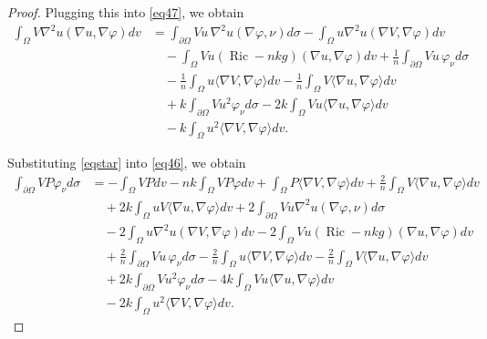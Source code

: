 \documentclass[10pt,a4paper]{amsart}
\begin{document}
\begin{proof}
Plugging this into \eqref{eq47}, we obtain
\begin{align}\label{eqstar}
\int_{\Omega}V\nabla^{2}u(\nabla u,\nabla\varphi)dv
&=
\int_{\partial\Omega}Vu\,\nabla^{2}u(\nabla\varphi,\nu)d\sigma
-
\int_{\Omega}u\nabla^{2}u(\nabla V,\nabla\varphi)dv
\nonumber\\
&\quad
-
\int_{\Omega}Vu(\operatorname{Ric}-nkg)(\nabla u,\nabla\varphi)dv
+
\frac{1}{n}\int_{\partial\Omega}Vu\,\varphi_{\nu}d\sigma
\nonumber\\
&\quad
-
\frac{1}{n}\int_{\Omega}u\langle\nabla V,\nabla\varphi\rangle dv
-
\frac{1}{n}\int_{\Omega}V\langle\nabla u,\nabla\varphi\rangle dv
\nonumber\\
&\quad
+
k\int_{\partial\Omega}Vu^{2}\varphi_{\nu}d\sigma
-
2k\int_{\Omega}Vu\langle\nabla u,\nabla\varphi\rangle dv
\nonumber\\
&\quad
-
k\int_{\Omega}u^{2}\langle\nabla V,\nabla\varphi\rangle dv.
\end{align}

Substituting \eqref{eqstar} into \eqref{eq46}, we obtain
\begin{align}\label{eqtwostar}
\int_{\partial\Omega}VP\varphi_{\nu}d\sigma
&=
-\int_{\Omega}VPdv
-nk\int_{\Omega}VP\varphi dv
+
\int_{\Omega}P\langle\nabla V,\nabla\varphi\rangle dv
+
\frac{2}{n}\int_{\Omega}V\langle\nabla u,\nabla\varphi\rangle dv
\nonumber\\
&\quad
+
2k\int_{\Omega}uV\langle\nabla u,\nabla\varphi\rangle dv
+
2\int_{\partial\Omega}Vu\nabla^{2}u(\nabla\varphi,\nu) d\sigma
\nonumber\\
&\quad
-
2\int_{\Omega}u\nabla^{2}u(\nabla V,\nabla\varphi)dv
-
2\int_{\Omega}Vu(\operatorname{Ric}-nkg)(\nabla u,\nabla\varphi)dv
\nonumber\\
&\quad
+
\frac{2}{n}\int_{\partial\Omega}Vu\,\varphi_{\nu}d\sigma
-
\frac{2}{n}\int_{\Omega}u\langle\nabla V,\nabla\varphi\rangle dv
-
\frac{2}{n}\int_{\Omega}V\langle\nabla u,\nabla\varphi\rangle dv
\nonumber\\
&\quad
+
2k\int_{\partial\Omega}Vu^{2}\varphi_{\nu}d\sigma
-
4k\int_{\Omega}Vu\langle\nabla u,\nabla\varphi\rangle dv
\nonumber\\
&\quad
-
2k\int_{\Omega}u^{2}\langle\nabla V,\nabla\varphi\rangle dv.
\end{align}


\end{proof}
\end{document}
